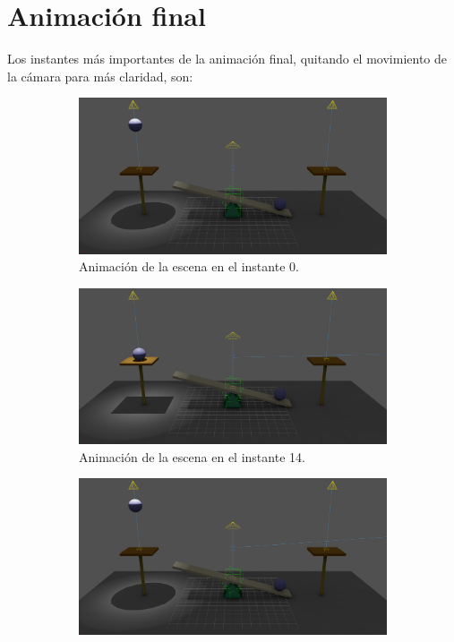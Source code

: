 \documentclass{article}
\begin{document}
\newpage

\section{Animación final}

Los instantes más importantes de la animación final, quitando el movimiento de la cámara para más claridad, son:

\begin{figure}[H]
    \centering 
\begin{subfigure}[t]{0.48\textwidth}
    \centering
    \includegraphics[width=\textwidth]{imagenes/animaciones/general/0.jpg}
    \caption{Animación de la escena en el instante 0.}
 \end{subfigure}
\hfill
 \begin{subfigure}[t]{0.48\textwidth}
    \centering
    \includegraphics[width=\textwidth]{imagenes/animaciones/general/14.jpg}
    \caption{Animación de la escena en el instante 14.}
 \end{subfigure}
\hfill
 \begin{subfigure}[t]{0.48\textwidth}
    \centering
    \includegraphics[width=\textwidth]{imagenes/animaciones/general/26.jpg}

\end{subfigure}
\end{figure}
\end{document}

